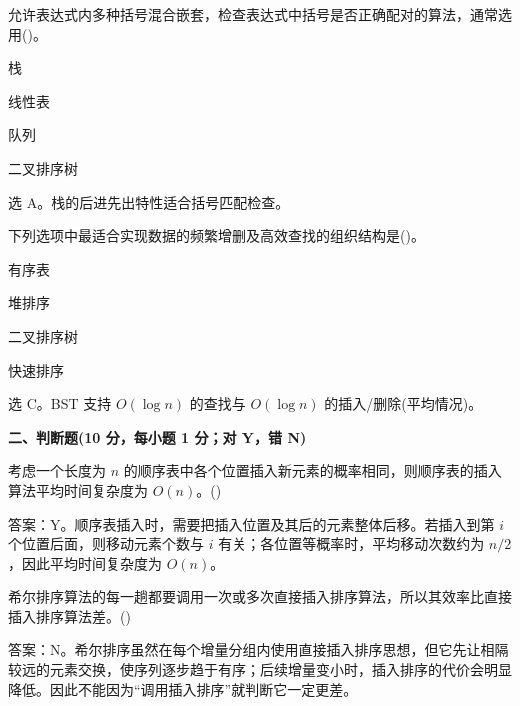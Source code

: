 \begin{question}
允许表达式内多种括号混合嵌套，检查表达式中括号是否正确配对的算法，通常选用(\quad)。
\begin{choiceoptions}[2]
  \item 栈
  \item 线性表
  \item 队列
  \item 二叉排序树
\end{choiceoptions}
\begin{solution}
选 A。栈的后进先出特性适合括号匹配检查。
\end{solution}
\end{question}

\begin{question}
下列选项中最适合实现数据的频繁增删及高效查找的组织结构是(\quad)。
\begin{choiceoptions}[2]
  \item 有序表
  \item 堆排序
  \item 二叉排序树
  \item 快速排序
\end{choiceoptions}
\begin{solution}
选 C。BST 支持 $O(\log n)$ 的查找与 $O(\log n)$ 的插入/删除(平均情况)。
\end{solution}
\end{question}




\textbf{二、判断题(10 分，每小题 1 分；对 Y，错 N)}

\begin{question}
考虑一个长度为 $n$ 的顺序表中各个位置插入新元素的概率相同，则顺序表的插入算法平均时间复杂度为 $O(n)$。(\quad)
\begin{solution}
答案：Y。顺序表插入时，需要把插入位置及其后的元素整体后移。若插入到第 $i$ 个位置后面，则移动元素个数与 $i$ 有关；各位置等概率时，平均移动次数约为 $n/2$，因此平均时间复杂度为 $O(n)$。
\end{solution}
\end{question}

\begin{question}
希尔排序算法的每一趟都要调用一次或多次直接插入排序算法，所以其效率比直接插入排序算法差。(\quad)
\begin{solution}
答案：N。希尔排序虽然在每个增量分组内使用直接插入排序思想，但它先让相隔较远的元素交换，使序列逐步趋于有序；后续增量变小时，插入排序的代价会明显降低。因此不能因为“调用插入排序”就判断它一定更差。
\end{solution}
\end{question}

